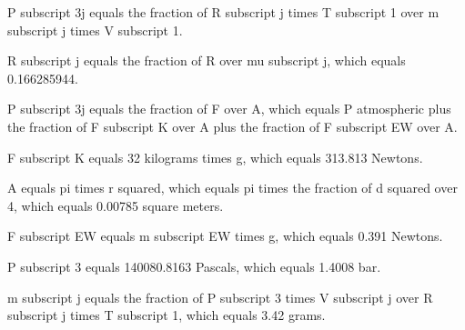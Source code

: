 P subscript 3j equals the fraction of R subscript j times T subscript 1 over m subscript j times V subscript 1.

R subscript j equals the fraction of R over mu subscript j, which equals 0.166285944.

P subscript 3j equals the fraction of F over A, which equals P atmospheric plus the fraction of F subscript K over A plus the fraction of F subscript EW over A.

F subscript K equals 32 kilograms times g, which equals 313.813 Newtons.

A equals pi times r squared, which equals pi times the fraction of d squared over 4, which equals 0.00785 square meters.

F subscript EW equals m subscript EW times g, which equals 0.391 Newtons.

P subscript 3 equals 140080.8163 Pascals, which equals 1.4008 bar.

m subscript j equals the fraction of P subscript 3 times V subscript j over R subscript j times T subscript 1, which equals 3.42 grams.